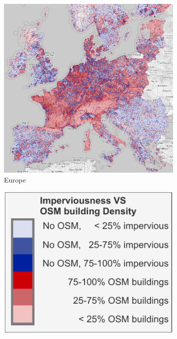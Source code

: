 \begin{figure}[H]
                \begin{subfigure}{0.48\textwidth}
                    \centering
                    \includegraphics[width=\linewidth,height=\linewidth]{figs_06/osm_impcop.png}
                    \caption{Europe}
                    \label{fig:osm_vs_cop_europe1} %
                \end{subfigure}
                \hfill %
                \begin{subfigure}{0.48\textwidth}
                    \centering
                    \includegraphics[width=\linewidth,height=\linewidth]{figs_06/thesis_legends-Imperviousness vs OSM.pdf}

\end{subfigure}
\end{figure}
